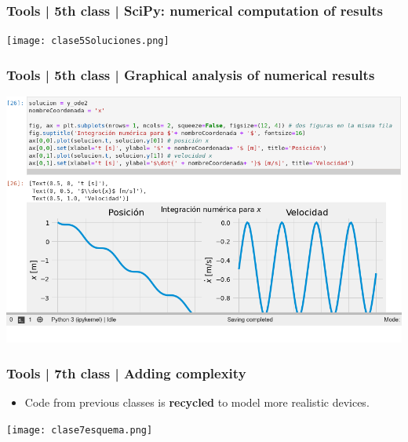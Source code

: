 \documentclass[aspectratio=169]{beamer}
\begin{document}
\begin{frame}
	\frametitle{Tools | 5th class | SciPy: numerical computation of results}
	\begin{block}{}
	\texttt{[image: clase5Soluciones.png]}
	\end{block}
\end{frame}

\begin{frame}
	\frametitle{Tools | 5th class | Graphical analysis of numerical results}
	\begin{block}{}
	\includegraphics[width= \textwidth]{clase5Representación}
	\end{block}
\end{frame}

\begin{frame}
	\frametitle{Tools | 7th class | Adding complexity}
	\begin{block}{}
		\begin{itemize}
			\item Code from previous classes is \textbf{recycled} to model more realistic devices.
		\end{itemize}
	\texttt{[image: clase7esquema.png]}
	\end{block}
\end{frame}
\end{document}
